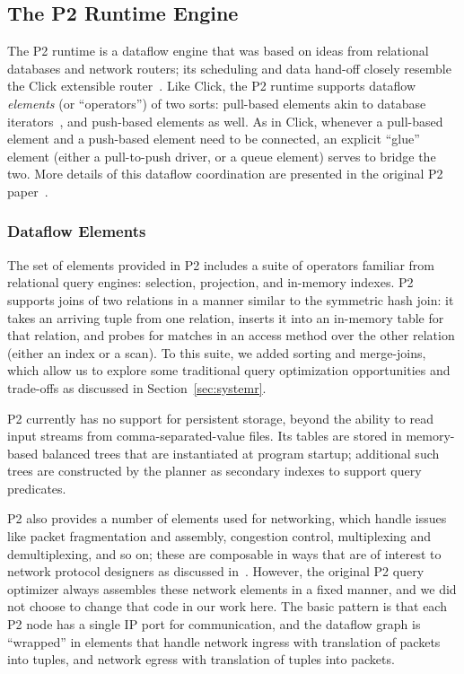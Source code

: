 \documentclass{sigmod08}
\begin{document}
\subsection{The P2 Runtime Engine}
The P2 runtime is a dataflow engine that was based on ideas from relational databases and network routers; its scheduling and data hand-off closely resemble the Click extensible router~\cite{click-tocs}.  Like Click, the P2 runtime supports dataflow {\em elements} (or ``operators'') of two sorts: pull-based elements akin to database iterators~\cite{graefe-survey}, and push-based elements as well.  As in Click, whenever a pull-based element and a push-based element need to be connected, an explicit ``glue'' element (either a pull-to-push driver, or a queue element) serves to bridge the two.  More details of this dataflow coordination are presented in the original P2 paper~\cite{loo-sosp05}.

\subsubsection{Dataflow Elements}
The set of elements provided in P2 includes a suite of operators familiar from relational query engines: selection, projection, and in-memory indexes.  P2 supports joins of two relations in a manner similar to the symmetric hash join: it takes an arriving tuple from one relation, inserts it into an in-memory table for that relation, and probes for matches in an access method over the other relation (either an index or a scan).  To this suite, we added sorting and merge-joins, which allow us to explore some traditional query optimization opportunities and trade-offs as discussed in Section~\ref{sec:systemr}.

P2 currently has no support for persistent storage, beyond the ability to read input streams from comma-separated-value files.  Its tables are stored in memory-based balanced trees that are instantiated at program startup; additional such trees are constructed by the planner as secondary indexes to support query predicates.

P2 also provides a number of elements used for networking, which handle issues like packet fragmentation and assembly, congestion control, multiplexing and demultiplexing, and so on; these are composable in ways that are of interest to network protocol designers as discussed in~\cite{condie-hotnets05}.  However, the original P2 query optimizer always assembles these network elements in a fixed manner, and we did not choose to change that code in our work here.  The basic pattern is that each P2 node has a single IP port for communication, and the dataflow graph is ``wrapped'' in elements that handle network ingress with translation of packets into tuples, and network egress with translation of tuples into packets.
\end{document}
